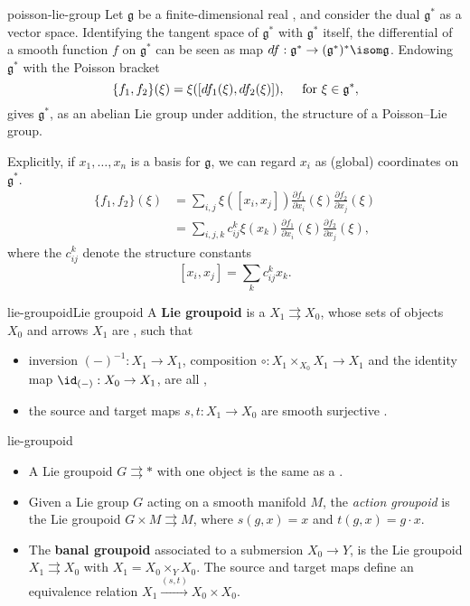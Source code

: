\begin{example}{poisson-lie-group}
    Let $\mathfrak{g}$ be a finite-dimensional real , and consider the dual $\mathfrak{g}^*$ as a vector space. Identifying the tangent space of $\mathfrak{g}^*$ with $\mathfrak{g}^*$ itself, the differential of a smooth function $f$ on $\mathfrak{g}^*$ can be seen as map $df : \mathfrak{g}^* \to (\mathfrak{g}^*)^* \isom \mathfrak{g}$. Endowing $\mathfrak{g}^*$ with the Poisson bracket
    \[ \{ f_1, f_2 \}(\xi) = \xi([df_1(\xi), df_2(\xi)]), \quad \textup{ for } \xi \in \mathfrak{g}^* , \]
    gives $\mathfrak{g}^*$, as an abelian Lie group under addition, the structure of a Poisson--Lie group.
    
    Explicitly, if $x_1, \ldots, x_n$ is a basis for $\mathfrak{g}$, we can regard $x_i$ as (global) coordinates on $\mathfrak{g}^*$.
    \[ \begin{aligned}
        \{ f_1, f_2 \}(\xi)
            &= \sum_{i, j} \xi([ x_i, x_j]) \frac{\partial f_1}{\partial x_i}(\xi) \frac{\partial f_2}{\partial x_j} (\xi) \\
            &= \sum_{i, j, k} c_{ij}^k \xi(x_k) \frac{\partial f_1}{\partial x_i}(\xi) \frac{\partial f_2}{\partial x_j} (\xi) ,
    \end{aligned} \]
    where the $c_{ij}^k$ denote the structure constants
    \[ [x_i, x_j] = \sum_k c_{ij}^k x_k . \]
\end{example}

\begin{topic}{lie-groupoid}{Lie groupoid}
    A \textbf{Lie groupoid} is a  $X_1 \rightrightarrows X_0$, whose sets of objects $X_0$ and arrows $X_1$ are , such that
    \begin{itemize}
        \item inversion $(-)^{-1} : X_1 \to X_1$, composition $\circ : X_1 \times_{X_0} X_1 \to X_1$ and the identity map $\id_{(-)} : X_0 \to X_1$, are all ,
        \item the source and target maps $s, t : X_1 \to X_0$ are smooth surjective .
    \end{itemize}
\end{topic}

\begin{example}{lie-groupoid}
    \begin{itemize}
        \item A Lie groupoid $G \rightrightarrows *$ with one object is the same as a .
        \item Given a Lie group $G$ acting on a smooth manifold $M$, the \textit{action groupoid} is the Lie groupoid $G \times M \rightrightarrows M$, where $s(g, x) = x$ and $t(g, x) = g \cdot x$.
        \item The \textbf{banal groupoid} associated to a submersion $X_0 \to Y$, is the Lie groupoid $X_1 \rightrightarrows X_0$ with $X_1 = X_0 \times_Y X_0$. The source and target maps define an equivalence relation $X_1 \xrightarrow{(s, t)} X_0 \times X_0$.
    \end{itemize}
\end{example}
